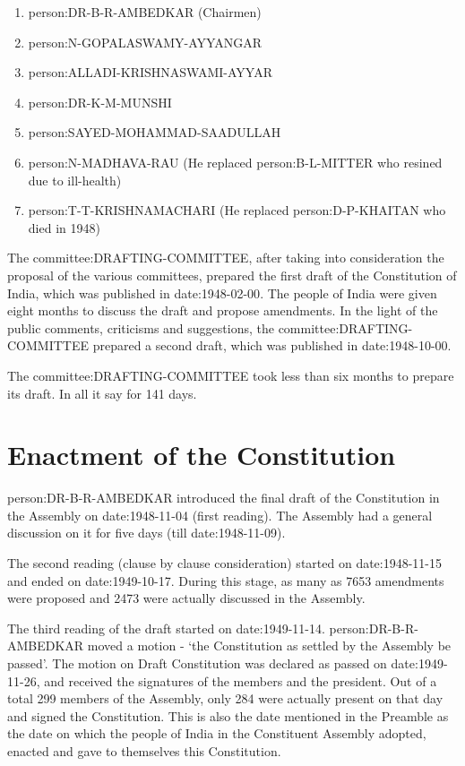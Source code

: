 \begin{enumerate}
  \item \gls{person:DR-B-R-AMBEDKAR} ({ Chairmen})
  \item \gls{person:N-GOPALASWAMY-AYYANGAR}
  \item \gls{person:ALLADI-KRISHNASWAMI-AYYAR}
  \item \gls{person:DR-K-M-MUNSHI}
  \item \gls{person:SAYED-MOHAMMAD-SAADULLAH}
  \item \gls{person:N-MADHAVA-RAU} (He replaced \gls{person:B-L-MITTER} who resined due to ill-health)
  \item \gls{person:T-T-KRISHNAMACHARI} (He replaced \gls{person:D-P-KHAITAN} who died in 1948)
\end{enumerate}

The \gls{committee:DRAFTING-COMMITTEE}, after taking into consideration the proposal of the various committees, prepared the first draft of the Constitution of India, which was published in \gls{date:1948-02-00}. The people of India were given eight months to discuss the draft and propose amendments. In the light of the public comments, criticisms and suggestions, the \gls{committee:DRAFTING-COMMITTEE} prepared a second draft, which was published in \gls{date:1948-10-00}.

The \gls{committee:DRAFTING-COMMITTEE} took less than six months to prepare its draft. In all it say for 141 days.

\section{Enactment of the Constitution}

\gls{person:DR-B-R-AMBEDKAR} introduced the final draft of the Constitution in the Assembly on \gls{date:1948-11-04} (first reading). The Assembly had a general discussion on it for five days (till \gls{date:1948-11-09}).

The second reading (clause by clause consideration) started on \gls{date:1948-11-15} and ended on \gls{date:1949-10-17}. During this stage, as many as 7653 amendments were proposed and 2473 were actually discussed in the Assembly.

The third reading of the draft started on \gls{date:1949-11-14}. \gls{person:DR-B-R-AMBEDKAR} moved a motion - `the Constitution as settled by the Assembly be passed'. The motion on Draft Constitution was declared as passed on \gls{date:1949-11-26}, and received the signatures of the members and the president. Out of a total 299 members of the Assembly, only 284 were actually present on that day and signed the Constitution. This is also the date mentioned in the Preamble as the date on which the people of India in the Constituent Assembly adopted, enacted and gave to themselves this Constitution.


